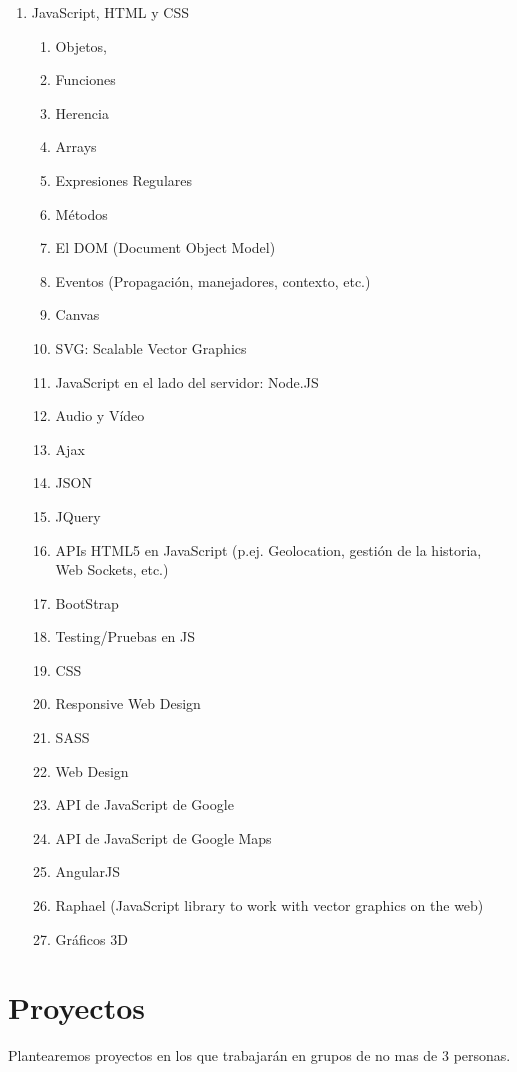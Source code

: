 \documentclass[11pt,a4paper]{article}
\begin{document}
\begin{enumerate}
\item JavaScript, HTML y CSS
  \begin{enumerate}
  \item Objetos, 
  \item Funciones 
  \item Herencia
  \item Arrays
  \item Expresiones Regulares
  \item Métodos
  \item El DOM (Document Object Model)
  \item Eventos (Propagación, manejadores, contexto, etc.)
  \item Canvas
  \item SVG: Scalable Vector Graphics
  \item JavaScript en el lado del servidor: Node.JS
  \item Audio y Vídeo
  \item Ajax
  \item JSON
  \item JQuery
  \item APIs HTML5 en JavaScript (p.ej. Geolocation, gestión de la historia, Web Sockets, etc.)
  \item BootStrap
  \item Testing/Pruebas en JS
  \item CSS
  \item Responsive Web Design
  \item SASS
  \item Web Design
  \item API de JavaScript de Google
  \item API de JavaScript de Google Maps
  \item AngularJS
  \item Raphael (JavaScript library to work with vector graphics on the web)
  \item Gráficos 3D
  \end{enumerate}
\end{enumerate}

\section{Proyectos}
Plantearemos proyectos en los que trabajarán en grupos de no mas de 3 personas.
\end{document}
